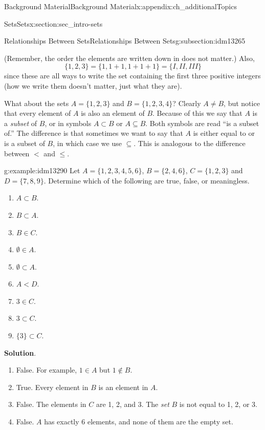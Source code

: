 \documentclass[oneside,10pt,]{book}
\numberwithin{equation}{chapter}
\newcommand{\lt}{<}
\begin{document}
\begin{appendixptx}{Background Material}{}{Background Material}{}{}{x:appendix:ch_additionalTopics}
\begin{sectionptx}{Sets}{}{Sets}{}{}{x:section:sec_intro-sets}
\begin{subsectionptx}{Relationships Between Sets}{}{Relationships Between Sets}{}{}{g:subsection:idm13265}
%
\par
(Remember, the order the elements are written down in does not matter.) Also,%
\begin{equation*}
\{1, 2, 3\} = \{1, 1+1, 1+1+1\} = \{I, II, III\}
\end{equation*}
since these are all ways to write the set containing the first three positive integers (how we write them doesn't matter, just what they are).%
\par
What about the sets \(A = \{1, 2, 3\}\) and \(B = \{1, 2, 3, 4\}\)? Clearly \(A \ne B\), but notice that every element of \(A\) is also an element of \(B\). Because of this we say that \(A\) is a \emph{subset}  of \(B\), or in symbols \(A \subset B\) or \(A \subseteq B\). Both symbols are read ``is a subset of.'' The difference is that sometimes we want to say that \(A\) is either equal to or is a subset of \(B\), in which case we use \(\subseteq\). This is analogous to the difference between \(\lt\) and \(\le\).%
\begin{example}{}{g:example:idm13290}%
Let \(A = \{1, 2, 3, 4, 5, 6\}\), \(B = \{2, 4, 6\}\), \(C = \{1, 2, 3\}\) and \(D = \{7, 8, 9\}\). Determine which of the following are true, false, or meaningless.%
\par
%
\begin{enumerate}
\item{}\(A \subset B\).%
\item{}\(B \subset A\).%
\item{}\(B \in C\).%
\item{}\(\emptyset \in A\).%
\item{}\(\emptyset \subset A\).%
\item{}\(A \lt  D\).%
\item{}\(3 \in C\).%
\item{}\(3 \subset C\).%
\item{}\(\{3\} \subset C\).%
\end{enumerate}
%
\par\smallskip%
\noindent\textbf{Solution}.\hypertarget{g:solution:idm13317}{}\quad{}%
\begin{enumerate}
\item{}False. For example, \(1\in A\) but \(1 \notin B\).%
\item{}True. Every element in \(B\) is an element in \(A\).%
\item{}False. The elements in \(C\) are 1, 2, and 3. The \emph{set} \(B\) is not equal to 1, 2, or 3.%
\item{}False. \(A\) has exactly 6 elements, and none of them are the empty set.%

\end{enumerate}
\end{example}
\end{subsectionptx}
\end{sectionptx}
\end{appendixptx}
\end{document}
